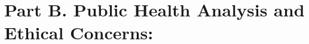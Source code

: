 \section{Part B. Public Health Analysis and Ethical Concerns:}
\label{part_b}
\cite{icarte2018teaching}
